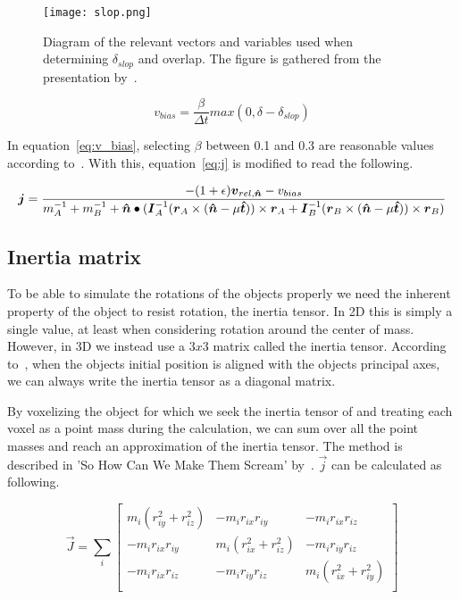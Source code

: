\begin{figure}[H]
  \centering
  \texttt{[image: slop.png]}
  \caption{Diagram of the relevant vectors and variables used when determining $\delta_{slop}$ and
  overlap. The figure is gathered from the presentation by~\cite{catto2006}.}
  \label{fig:slop}
\end{figure}

\begin{equation}\label{eq:v_bias}
  v_{bias} = \frac{\beta}{\Delta t}max(0, \delta-\delta_{slop})
\end{equation}

In equation~\ref{eq:v_bias}, selecting $\beta$ between 0.1 and 0.3 are reasonable values according to~\cite{catto2006}.
With this, equation~\ref{eq:j} is modified to read the following.

\begin{equation}\label{eq:finalJ}
  \boldsymbol{j} = \frac{-(1+\epsilon)\boldsymbol{v}_{rel,\boldsymbol{\hat{n}}}-v_{bias}}
  {m_A^{-1}+m_B^{-1}+\boldsymbol{\hat{n}}\bullet(\boldsymbol{I}_A^{-1}(\boldsymbol{r}_A\times(\boldsymbol{\hat{n}}-\mu\boldsymbol{\hat{t}}))\times\boldsymbol{r}_A
  +\boldsymbol{I}_B^{-1}(\boldsymbol{r}_B\times(\boldsymbol{\hat{n}}-\mu\boldsymbol{\hat{t}}))\times\boldsymbol{r}_B)}
\end{equation}

\subsection{Inertia matrix}
To be able to simulate the rotations of the objects properly we need the inherent
property of the object to resist rotation, the inertia tensor.
In 2D this is simply a single value, at least when considering rotation around
the center of mass. However, in 3D we instead use a $3x3$ matrix called the
inertia tensor. According to~\cite{ragnemalmscream}, when the objects initial
position is aligned with the objects principal axes, we can always write the inertia tensor
as a diagonal matrix.

By voxelizing the object for which we seek the inertia tensor of and treating each voxel
as a point mass during the calculation, we can sum over all the point masses and reach
an approximation of the inertia tensor. The method is described in
 'So How Can We Make Them Scream' by~\cite{ragnemalmscream}.
$\vec{j}$ can be calculated as following.

 \begin{equation}
  \vec{J} = \sum_i
  \begin{bmatrix}
    m_i(r_{iy}^2 + r_{iz}^2) & -m_ir_{ix}r_{iy} & -m_ir_{ix}r_{iz} \\
    -m_ir_{ix}r_{iy} & m_i(r_{ix}^2 + r_{iz}^2) & -m_ir_{iy}r_{iz} \\
    -m_ir_{ix}r_{iz} & -m_ir_{iy}r_{iz} & m_i(r_{ix}^2 + r_{iy}^2) \\
  \end{bmatrix}
 \end{equation}


